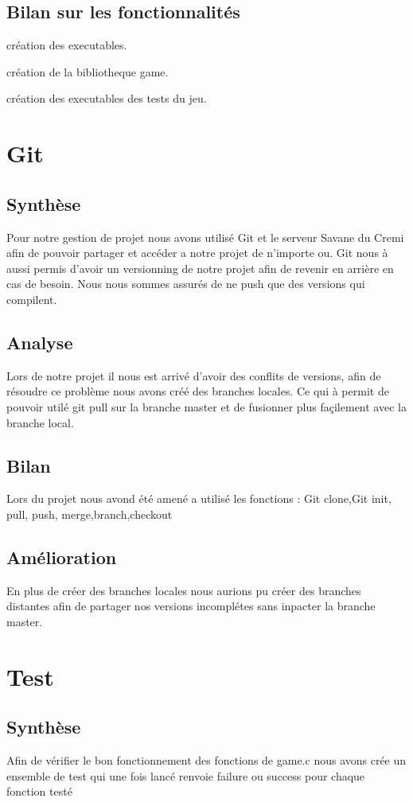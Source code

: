 \documentclass[12pt]{article}
\begin{document}
\subsection{Bilan sur les fonctionnalités}
création des executables.
 
création de la bibliotheque game.
 
création des executables des tests du jeu.
 
\section{Git}
\subsection{Synthèse}
Pour notre gestion de projet nous avons utilisé Git et le serveur Savane du Cremi afin de pouvoir partager et accéder a notre projet de n'importe ou.
Git nous à aussi permis d'avoir un versionning de notre projet afin de revenir en arrière en cas de besoin.
Nous nous sommes assurés de ne push que des versions qui compilent.
\subsection{Analyse}
Lors de notre projet il nous est arrivé d'avoir des conflits de versions, afin de résoudre ce problème nous avons créé des branches locales. 
Ce qui à permit de pouvoir utilé git pull sur la branche master et de fusionner plus façilement avec la branche local.
\subsection{Bilan}
Lors du projet nous avond été amené a utilisé les fonctions : Git clone,Git init, pull, push, merge,branch,checkout
\subsection{Amélioration}
En plus de créer des branches locales nous aurions pu créer des branches distantes afin de partager nos versions incomplétes sans inpacter la branche master.

\section{Test}
\subsection{Synthèse}
Afin de vérifier le bon fonctionnement des fonctions de game.c nous avons crée un ensemble de test qui une fois lancé renvoie failure ou success 
pour chaque fonction testé
\end{document}
